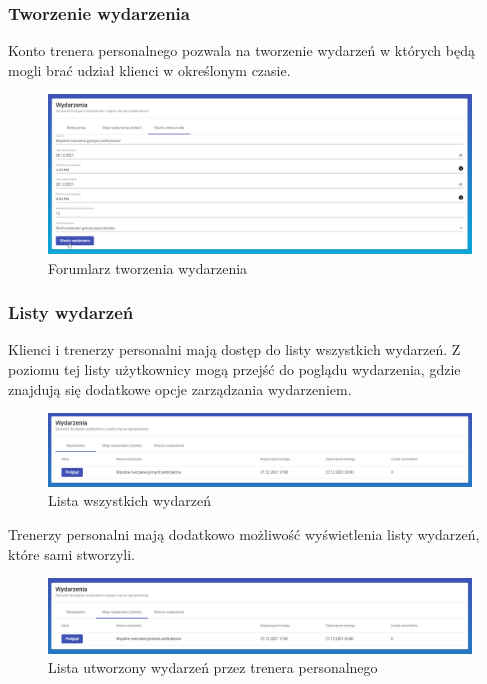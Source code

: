 \documentclass[a4paper,twoside,12pt]{book}
\begin{document}
\subsubsection{Tworzenie wydarzenia}
Konto trenera personalnego pozwala na tworzenie wydarzeń w których będą mogli brać udział klienci w określonym czasie.
\begin{figure}[H]
	\centering
	\includegraphics[width=1\linewidth]{../zrzuty_ekranu/dzialanie/wydarzenia/dodawanie_wydarzenia}
	\caption{Forumlarz tworzenia wydarzenia}
	\label{fig:dodawaniewydarzenia}
\end{figure}

\subsubsection{Listy wydarzeń}
Klienci i trenerzy personalni mają dostęp do listy wszystkich wydarzeń. Z poziomu tej listy użytkownicy mogą przejść do poglądu wydarzenia, gdzie znajdują się dodatkowe opcje zarządzania wydarzeniem.
\begin{figure}[H]
	\centering
	\includegraphics[width=1\linewidth]{../zrzuty_ekranu/dzialanie/wydarzenia/wszystkie_wydarzenia}
	\caption{Lista wszystkich wydarzeń}
	\label{fig:wszystkiewydarzenia}
\end{figure}

Trenerzy personalni mają dodatkowo możliwość wyświetlenia listy wydarzeń, które sami stworzyli.
\begin{figure}[H]
	\centering
	\includegraphics[width=1\linewidth]{../zrzuty_ekranu/dzialanie/wydarzenia/trener_lista_wydarzen}
	\caption{Lista utworzony wydarzeń przez trenera personalnego}
	\label{fig:trenerlistawydarzen}
\end{figure}
\end{document}
